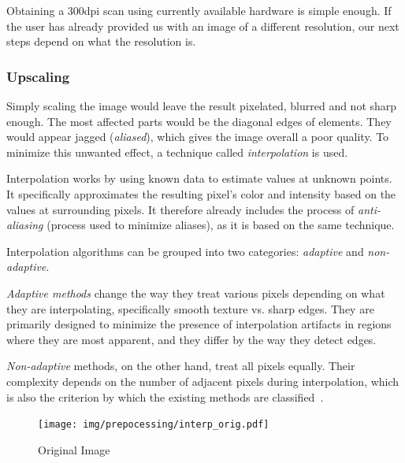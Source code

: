 Obtaining a 300dpi scan using currently available hardware is simple enough. If the user has already provided us with an image of a different resolution, our next steps depend on what the resolution is.

\subsubsection{Upscaling}

Simply scaling the image would leave the result pixelated, blurred and not sharp enough. The most affected parts would be the diagonal edges of elements. They would appear jagged (\emph{aliased}), which gives the image overall a poor quality. To minimize this unwanted effect, a technique called \emph{interpolation} is used.

Interpolation works by using known data to estimate values at unknown points. It specifically approximates the resulting pixel's color and intensity based on the values at surrounding pixels. It therefore already includes the process of \emph{anti-aliasing} (process used to minimize aliases), as it is based on the same technique.

Interpolation algorithms can be grouped into two categories: \emph{adaptive} and \emph{non-adaptive}.

\emph{Adaptive methods} change the way they treat various pixels depending on what they are interpolating, specifically smooth texture vs. sharp edges. They are primarily designed to minimize the presence of interpolation artifacts in regions where they are most apparent, and they differ by the way they detect edges.

\emph{Non-adaptive} methods, on the other hand, treat all pixels equally. Their complexity depends on the number of adjacent pixels during interpolation, which is also the criterion by which the existing methods are classified~\cite{interpolation}.

\begin{figure}[H]
\centering
\texttt{[image: img/prepocessing/interp\_orig.pdf]}
\caption{Original Image} \label{fig:1a}
\end{figure}

